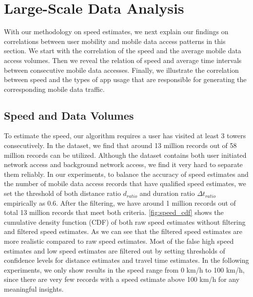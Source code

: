 \section{Large-Scale Data Analysis}\label{experiments}

With our methodology on speed estimates, we next explain our findings on correlations between user mobility and mobile data access patterns in this section. We start with the correlation of the speed and the average mobile data access volumes. Then we reveal the relation of speed and average time intervals between consecutive mobile data accesses. Finally, we illustrate the correlation between speed and the types of app usage that are responsible for generating the corresponding mobile data traffic.




\subsection{Speed and Data Volumes}

To estimate the speed, our algorithm requires a user has visited at least 3 towers consecutively. In the dataset, we find that around 13 million records out of 58 million records can be utilized. Although the dataset contains both user initiated network access and background network access, we find it very hard to separate them reliably. In our experiments, to balance the accuracy of speed estimates and the number of mobile data access records that have qualified speed estimates, we set the threshold of both distance ratio $d_{ratio}$ and duration ratio $\Delta t_{ratio}$ empirically as 0.6. After the filtering, we have around 1 million records out of total 13 million records that meet both criteria. \autoref{fig:speed_cdf} shows the cumulative density function (CDF) of both raw speed estimates without filtering and filtered speed estimates. As we can see that the filtered speed estimates are more realistic compared to raw speed estimates. Most of the false high speed estimates and low speed estimates are filtered out by setting thresholds of confidence levels for distance estimates and travel time estimates.
In the following experiments, we only show results in the speed range from 0 km/h to 100 km/h, since there are very few records with a speed estimate above 100 km/h for any meaningful insights.

